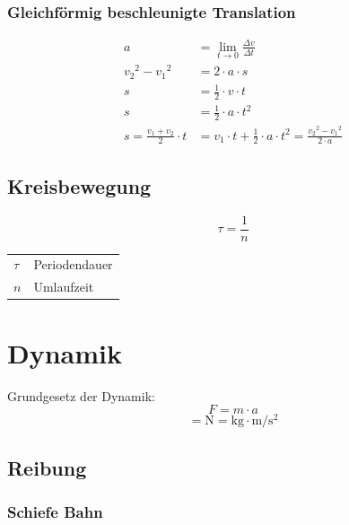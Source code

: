 \documentclass[a4paper]{IEEEtran}
\makeatletter
\newenvironment{conditions}
  {\par\vspace{\abovedisplayskip}\noindent\begin{tabular}{>{$}l<{$} @{${}={}$} l}}
  {\end{tabular}\par\vspace{\belowdisplayskip}}
\makeatother
\begin{document}
  \subsubsection{Gleichförmig beschleunigte Translation}
  \begin{align}
    a &= \lim_{t \to 0} \frac{\Delta{}v}{\Delta{}t} \\
    v_2{}^2 - v_1{}^2 &= 2 \cdot a \cdot s \\
    s &= \frac{1}{2} \cdot v \cdot t \\
    s &= \frac{1}{2} \cdot a \cdot t^2 \\
    s = \frac{v_1 + v_2}{2} \cdot t &= v_1 \cdot t + \frac{1}{2} \cdot a \cdot t^2 = \frac{v_2{}^{2} - v_1{}^2}{2 \cdot a}
  \end{align}
  \subsection{Kreisbewegung}
  \begin{equation}
    \tau = \frac{1}{n}
  \end{equation}
  \begin{conditions}
    \tau & Periodendauer \\
    n & Umlaufzeit
  \end{conditions}

  \section{Dynamik}
  Grundgesetz der Dynamik:
  \begin{equation}
    F = m \cdot a
  \end{equation}
  \begin{equation}
    [F] = \si{\newton} = \si{\kilo\gram} \cdot \si{\metre\per\second\squared}
  \end{equation}

  \subsection{Reibung}

  \subsubsection{Schiefe Bahn}
\end{document}
